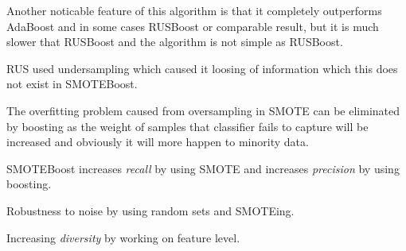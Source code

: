 \documentclass[11pt]{article}
\begin{document}
Another noticable feature of this algorithm is that it completely
outperforms AdaBoost and in some cases RUSBoost or comparable result,
but it is much slower that RUSBoost and the algorithm is not simple as
RUSBoost.

RUS used undersampling which caused it loosing of information which this
does not exist in SMOTEBoost.

The overfitting problem caused from oversampling in SMOTE can be
eliminated by boosting as the weight of samples that classifier fails to
capture will be increased and obviously it will more happen to minority
data.

SMOTEBoost increases \emph{recall} by using SMOTE and increases
\emph{precision} by using boosting.

Robustness to noise by using random sets and SMOTEing.

Increasing \emph{diversity} by working on feature level.
\end{document}
